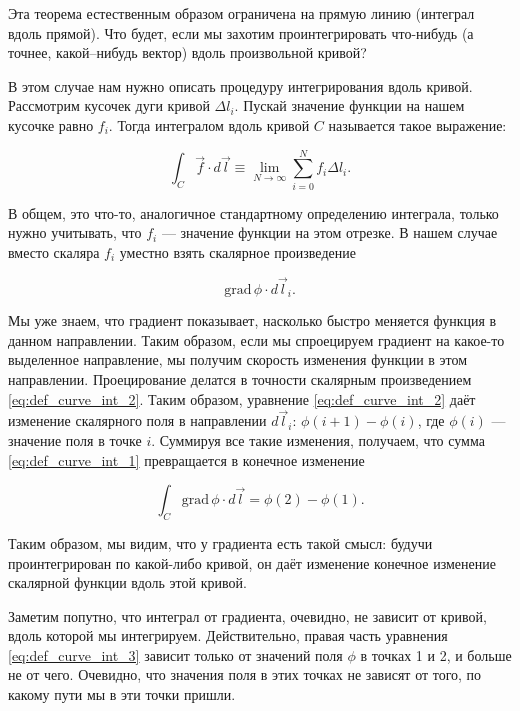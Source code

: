 \documentclass[a4paper,12pt]{article}
\numberwithin{equation}{section}
\newcommand{\grad}{\mathrm{grad}\,}
\begin{document}
Эта теорема естественным образом ограничена на прямую линию (интеграл
вдоль прямой). Что будет, если мы захотим проинтегрировать что-нибудь
(а точнее, какой--нибудь вектор) вдоль произвольной кривой? 

В этом случае нам нужно описать процедуру интегрирования вдоль
кривой. Рассмотрим кусочек дуги кривой $\Delta l_i$. Пускай значение функции
на нашем кусочке равно $f_i$. Тогда интегралом вдоль кривой $C$
называется такое выражение:

\begin{equation}
  \label{eq:def_curve_int_1}
  \int_C  \vec{f} \cdot d\vec{l} \equiv \lim_{N\to \infty} \sum_{i=0}^N f_i \Delta l_i. 
\end{equation}

В общем, это что-то, аналогичное стандартному определению интеграла,
только нужно учитывать, что $f_i$ --- значение функции на этом
отрезке. В нашем случае вместо скаляра $f_i$ уместно взять скалярное
произведение 

\begin{equation}
  \label{eq:def_curve_int_2}
  \grad \phi \cdot d\vec{l}_i.
\end{equation}

Мы уже знаем, что градиент показывает, насколько быстро меняется
функция в данном направлении. Таким образом, если мы спроецируем
градиент на какое-то выделенное направление, мы получим скорость
изменения функции в этом направлении. Проецирование делатся в точности
скалярным произведением \eqref{eq:def_curve_int_2}. Таким образом,
уравнение \eqref{eq:def_curve_int_2} даёт изменение скалярного поля в
направлении $d\vec{l}_i$: $\phi(i+1) - \phi(i)$, где $\phi(i)$ ---
значение поля в точке $i$. Суммируя все такие изменения, получаем, что
сумма \eqref{eq:def_curve_int_1} превращается в конечное изменение 

\begin{equation}
  \label{eq:def_curve_int_3}
  \int_C \grad \phi \cdot d\vec{l} = \phi(2) - \phi(1).
\end{equation}

Таким образом, мы видим, что у градиента есть такой смысл: будучи
проинтегрирован по какой-либо кривой, он даёт изменение конечное
изменение скалярной функции вдоль этой кривой. 

Заметим попутно, что интеграл от градиента, очевидно, не зависит от
кривой, вдоль которой мы интегрируем. Действительно, правая часть
уравнения \eqref{eq:def_curve_int_3} зависит только от значений поля
$\phi$ в точках 1 и 2, и больше не от чего. Очевидно, что значения
поля в этих точках не зависят от того, по какому пути мы в эти точки
пришли. 
\end{document}

